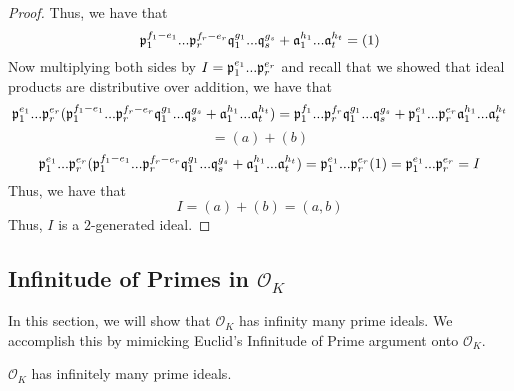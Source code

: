 \begin{proof}
Thus, we have that
\[\mathfrak{p}_1^{f_1 - e_1} ... \mathfrak{p}_r^{f_r - e_r} \mathfrak{q}_1^{g_1} ... \mathfrak{q}_s^{g_s} + \mathfrak{a}_1^{h_1} ... \mathfrak{a}_t^{h_t} = (1)\]
Now multiplying both sides by $I = \mathfrak{p}_1^{e_1} ... \mathfrak{p}_r^{e_r}$ and recall that we showed that ideal products are distributive over addition, we have that
\[\mathfrak{p}_1^{e_1} ... \mathfrak{p}_r^{e_r}(\mathfrak{p}_1^{f_1 - e_1} ... \mathfrak{p}_r^{f_r - e_r} \mathfrak{q}_1^{g_1} ... \mathfrak{q}_s^{g_s} + \mathfrak{a}_1^{h_1} ... \mathfrak{a}_t^{h_t}) =  \mathfrak{p}_1^{f_1} ... \mathfrak{p}_r^{f_r} \mathfrak{q}_1^{g_1} ... \mathfrak{q}_s^{g_s} + \mathfrak{p}_1^{e_1} ... \mathfrak{p}_r^{e_r} \mathfrak{a}_1^{h_1} ... \mathfrak{a}_t^{h_t}\]
\[= (a) + (b)\]
\[\mathfrak{p}_1^{e_1} ... \mathfrak{p}_r^{e_r}(\mathfrak{p}_1^{f_1 - e_1} ... \mathfrak{p}_r^{f_r - e_r} \mathfrak{q}_1^{g_1} ... \mathfrak{q}_s^{g_s} + \mathfrak{a}_1^{h_1} ... \mathfrak{a}_t^{h_t}) = \mathfrak{p}_1^{e_1} ... \mathfrak{p}_r^{e_r}(1) = \mathfrak{p}_1^{e_1} ... \mathfrak{p}_r^{e_r} = I\]
Thus, we have that
\[I = (a) + (b) = (a, b)\]
Thus, $I$ is a $2$-generated ideal.
\end{proof}

\subsection{Infinitude of Primes in $\mathcal{O}_K$}

In this section, we will show that $\mathcal{O}_K$ has infinity many prime ideals. We accomplish this by mimicking Euclid's Infinitude of Prime argument onto $\mathcal{O}_K$.

\begin{theorem}
    $\mathcal{O}_K$ has infinitely many prime ideals.
\end{theorem}

